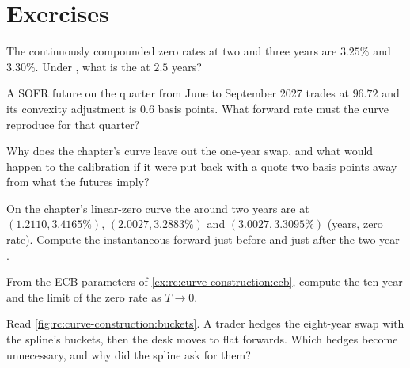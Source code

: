 \section{Exercises}

\begin{exercise}[$\star$]\label{exo:rc:curve-construction:1}
The continuously compounded zero rates at two and three years are $3.25\%$
and $3.30\%$. Under , what is the  at $2.5$ years?
\end{exercise}

\begin{exercise}[$\star$]\label{exo:rc:curve-construction:2}
A SOFR future on the quarter from June to September 2027 trades at $96.72$ and
its convexity adjustment is $0.6$ basis points. What forward rate must the curve
reproduce for that quarter?
\end{exercise}

\begin{exercise}[$\star$]\label{exo:rc:curve-construction:3}
Why does the chapter's curve leave out the one-year swap, and what would
happen to the calibration if it were put back with a quote two basis points
away from what the futures imply?
\end{exercise}

\begin{exercise}[$\star\star$]\label{exo:rc:curve-construction:4}
On the chapter's linear-zero curve the  around two years are at
$(1.2110, 3.4165\%)$, $(2.0027, 3.2883\%)$ and $(3.0027, 3.3095\%)$ (years,
zero rate). Compute the instantaneous forward just before and just after the
two-year .
\end{exercise}

\begin{exercise}[$\star\star$]\label{exo:rc:curve-construction:5}
From the ECB parameters of \cref{ex:rc:curve-construction:ecb}, compute the
ten-year  and the limit of the zero rate as $T\to 0$.
\end{exercise}

\begin{exercise}[$\star\star$]\label{exo:rc:curve-construction:6}
Read \cref{fig:rc:curve-construction:buckets}. A trader hedges the eight-year
swap with the spline's buckets, then the desk moves to flat forwards. Which
hedges become unnecessary, and why did the spline ask for them?
\end{exercise}

